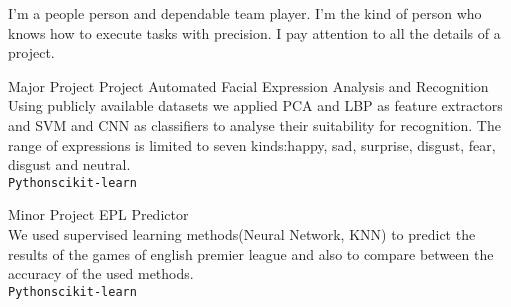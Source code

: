 \documentclass[9pt]{developercv} %
\begin{document}
\vspace{0.5cm}



\begin{minipage}[t]{0.4\textwidth} %
	\vspace{-\baselineskip} %
	I'm a people person and dependable team player. I'm the kind of person who knows how to execute tasks with precision. I pay attention to all the details of a project. 
\end{minipage}
\hfill %
\begin{minipage}[t]{0.5\textwidth} %
	\vspace{-\baselineskip} %
	\begin{barchart}{5.5}
	\end{barchart}
\end{minipage}

\begin{center}
\end{center}

\begin{entryList}
    \entry
    {
        Major Project
    }
    {
        Project Automated Facial Expression Analysis and
Recognition\\
    }
    {
    }
    {
        Using publicly available datasets we applied PCA and LBP as feature extractors and SVM and CNN as classifiers to analyse their suitability for recognition. The range of expressions is limited to seven kinds:happy, sad, surprise, disgust, fear, disgust and neutral.\\
        \texttt{Python}\slashsep\texttt{scikit-learn}
    }
    
    \entry
    {
        Minor Project
    }
    {
        EPL Predictor\\
    }
    {
    }
    {
        We used supervised learning
methods(Neural Network, KNN) to
predict the results of the games of
english premier league and also to
compare between the accuracy of
the used methods.   \\
        \texttt{Python}\slashsep\texttt{scikit-learn}
    }
\end{entryList}
\end{document}

